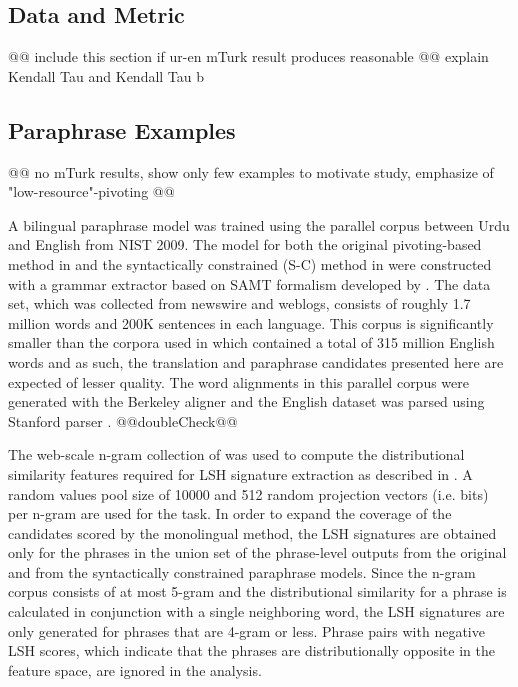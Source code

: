 \documentclass[11pt]{article}
\begin{document}
\subsection{Data and Metric}
@@ include this section if ur-en mTurk result produces reasonable 
@@ explain Kendall Tau and Kendall Tau b

\subsection{Paraphrase Examples}

@@ no mTurk results, show only few examples to motivate study, emphasize of "low-resource"-pivoting @@

A bilingual paraphrase model was trained using the parallel corpus between Urdu and English from NIST 2009. The model for both the original pivoting-based method in  and the syntactically constrained (S-C) method in  were constructed with a grammar extractor based on SAMT formalism developed by . The data set, which was collected from newswire and weblogs, consists of roughly 1.7 million words and 200K sentences in each language. This corpus is significantly smaller than the corpora used in  which contained a total of 315 million English words and as such, the translation and paraphrase candidates presented here are expected of lesser quality. The word alignments in this parallel corpus were generated with the Berkeley aligner and the English dataset was parsed using Stanford parser \cite{KleinManning03}. @@doubleCheck@@ %

The web-scale n-gram collection of  was used to compute the distributional similarity features required for LSH signature extraction as described in . A random values pool size of 10000 and 512 random projection vectors (i.e. bits) per n-gram are used for the task. In order to expand the coverage of the candidates scored by the monolingual method, the LSH signatures are obtained only for the phrases in the union set of the phrase-level outputs from the original and from the syntactically constrained paraphrase models. Since the n-gram corpus consists of at most 5-gram and the distributional similarity for a phrase is calculated in conjunction with a single neighboring word, the LSH signatures are only generated for phrases that are 4-gram or less. Phrase pairs with negative LSH scores, which indicate that the phrases are distributionally opposite in the feature space, are ignored in the analysis.
\end{document}
